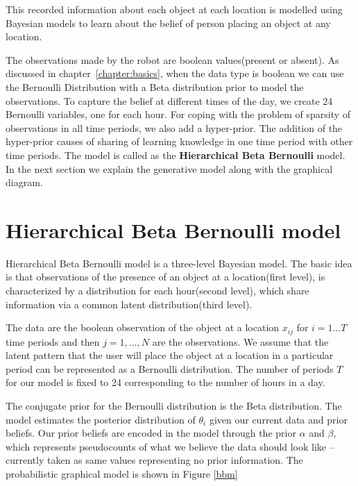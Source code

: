 This recorded information about each object at each location is modelled using Bayesian models to learn about the belief of person placing an object at any location.

The observations made by the robot are boolean values(present or absent). As discussed in chapter~\ref{chapter:basics}, when the data type is boolean we can use the Bernoulli Distribution with a Beta distribution prior to model the observations. To capture the belief at different times of the day, we create 24 Bernoulli variables, one for each hour. For coping with the problem of sparsity of observations in all time periods, we also add a hyper-prior. The addition of the hyper-prior causes of sharing of learning knowledge in one time period with other time periods. The model is called as the \textbf{Hierarchical Beta Bernoulli}  model. In the next section we explain the generative model along with the graphical diagram. 


\section{Hierarchical Beta Bernoulli model}

Hierarchical Beta Bernoulli model is a three-level Bayesian model. The basic idea is that observations of the presence of an object at a location(first level), is characterized by a distribution for each hour(second level), which share information via a common latent distribution(third level).

The data are the boolean observation of the object at a location $x_{ij}$ for $i = 1 \dots T$ time periods and then $j = 1, \dots , N$  are the observations.  We assume that the latent pattern that the user will place the object at a  location in a particular period can be represented as a Bernoulli distribution. The number of periods $T$ for our model is fixed to 24 corresponding to the number of hours in a day. 

The conjugate prior for the Bernoulli distribution is the Beta distribution. The model estimates the posterior distribution of $\theta_i$ given our current data and prior beliefs. Our prior beliefs are encoded in the model through the prior $\alpha$ and $\beta$, which represents pseudocounts of what we believe the data should look like – currently taken as same values representing no prior information. The probabilistic graphical model is shown in Figure \ref{bbm}

